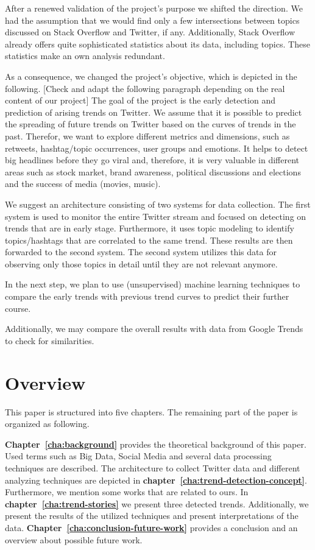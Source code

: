 After a renewed validation of the project’s purpose we shifted the direction. We had the assumption that we would find only a few intersections between topics discussed on Stack Overflow and Twitter, if any. Additionally, Stack Overflow already offers quite sophisticated statistics about its data, including topics. These statistics make an own analysis redundant.

As a consequence, we changed the project’s objective, which is depicted in the following.
[Check and adapt the following paragraph depending on the real content of our project]
The goal of the project is the early detection and prediction of arising trends on Twitter.
We assume that it is possible to predict the spreading of future trends on Twitter based on the curves of trends in the past. 
Therefor, we want to explore different metrics and dimensions, such as retweets, hashtag/topic occurrences, user groups and emotions.
It helps to detect big headlines before they go viral and, therefore, it is very valuable in different areas such as stock market, brand awareness, political discussions and elections and the success of media (movies, music). 

We suggest an architecture consisting of two systems for data collection. 
The first system is used to monitor the entire Twitter stream and focused on detecting on trends that are in early stage. Furthermore, it uses topic modeling to identify topics/hashtags that are correlated to the same trend.
These results are then forwarded to the second system. The second system utilizes this data for observing only those topics in detail until they are not relevant anymore. 

In the next step, we plan to use (unsupervised) machine learning techniques to compare the early trends with previous trend curves to predict their further course.

Additionally, we may compare the overall results with data from Google Trends to check for similarities.


\section{Overview}
\label{sec:overview}
This paper is structured into five chapters. The remaining part of the paper is organized as following.

\textbf{Chapter~\ref{cha:background}} provides the theoretical background of this paper. Used terms such as Big Data, Social Media and several data processing techniques are described. 
The architecture to collect Twitter data and different analyzing techniques are depicted in \textbf{chapter~\ref{cha:trend-detection-concept}}. Furthermore, we mention some works that are related to ours.
In \textbf{chapter~\ref{cha:trend-stories}} we present three detected trends. Additionally, we present the results of the utilized techniques and present interpretations of the data.
\textbf{Chapter~\ref{cha:conclusion-future-work}} provides a conclusion and an overview about possible future work.